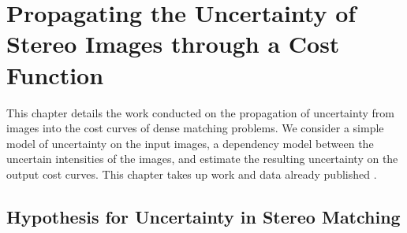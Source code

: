 \chapter{Propagating the Uncertainty of Stereo Images through a Cost Function}\label{chap:propagating}
This chapter details the work conducted on the propagation of uncertainty from images into the cost curves of dense matching problems. We consider a simple model of uncertainty on the input images, a dependency model between the uncertain intensities of the images, and estimate the resulting uncertainty on the output cost curves. This chapter takes up work and data already published \cite{malinowski_copulas_2022, malinowski_uncertainty_2023, malinowski_robust_2024}.

\section{Hypothesis for Uncertainty in Stereo Matching}\label{sec:sources_of_uncertainty}

